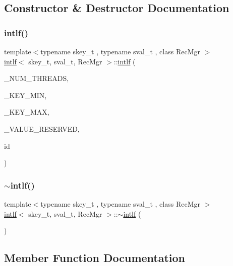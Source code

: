 \subsection{Constructor \& Destructor Documentation}
\mbox{\label{classintlf_a6bd5eb6671be5a08d0efdc23eced2725}} 
\subsubsection{\texorpdfstring{intlf()}{intlf()}}
{\footnotesize\ttfamily template$<$typename skey\+\_\+t , typename sval\+\_\+t , class Rec\+Mgr $>$ \\
\hyperlink{classintlf}{intlf}$<$ skey\+\_\+t, sval\+\_\+t, Rec\+Mgr $>$\+::\hyperlink{classintlf}{intlf} (\begin{DoxyParamCaption}\item[{const int}]{\+\_\+\+N\+U\+M\+\_\+\+T\+H\+R\+E\+A\+DS,  }\item[{const skey\+\_\+t \&}]{\+\_\+\+K\+E\+Y\+\_\+\+M\+IN,  }\item[{const skey\+\_\+t \&}]{\+\_\+\+K\+E\+Y\+\_\+\+M\+AX,  }\item[{const sval\+\_\+t \&}]{\+\_\+\+V\+A\+L\+U\+E\+\_\+\+R\+E\+S\+E\+R\+V\+ED,  }\item[{unsigned int}]{id }\end{DoxyParamCaption})\hspace{0.3cm}{\ttfamily [inline]}}

\mbox{\label{classintlf_a701e57f370a296fc3f73ed8c0ba0745c}} 
\subsubsection{\texorpdfstring{$\sim$intlf()}{~intlf()}}
{\footnotesize\ttfamily template$<$typename skey\+\_\+t , typename sval\+\_\+t , class Rec\+Mgr $>$ \\
\hyperlink{classintlf}{intlf}$<$ skey\+\_\+t, sval\+\_\+t, Rec\+Mgr $>$\+::$\sim$\hyperlink{classintlf}{intlf} (\begin{DoxyParamCaption}{ }\end{DoxyParamCaption})\hspace{0.3cm}{\ttfamily [inline]}}



\subsection{Member Function Documentation}
\mbox{\label{classintlf_aeeca12eca54beb687a0791436dec1933}} 
